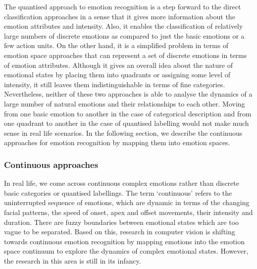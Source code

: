 \documentclass[10pt,journal,cspaper,compsoc]{IEEEtran}
\begin{document}
The quantised approach to emotion recognition is a step forward to the direct classification approaches in a sense that it gives more information about the emotion attributes and intensity. Also, it enables the classification of relatively large numbers of discrete emotions as compared to just the basic emotions or a few action units. On the other hand, it is a simplified problem in terms of emotion space approaches that can represent a set of discrete emotions in terms of emotion attributes. Although it gives an overall idea about the nature of emotional states by placing them into quadrants or assigning some level of intensity, it still leaves them indistinguishable in terms of fine categories. Nevertheless, neither of these two approaches is able to analyse the dynamics of a large number of natural emotions and their relationships to each other. Moving from one basic emotion to another in the case of categorical description and from one quadrant to another in the case of quantised labelling would not make much sense in real life scenarios. In the following section, we describe the continuous approaches for emotion recognition by mapping them into emotion spaces.

\subsubsection{Continuous approaches}

In real life, we come across continuous complex emotions rather than discrete basic categories or quantised labellings. The term `continuous' refers to the uninterrupted sequence of emotions, which are dynamic in terms of the changing facial patterns, the speed of onset, apex and offset movements, their intensity and duration. There are fuzzy boundaries between emotional states which are too vague to be separated. Based on this, research in computer vision is shifting towards continuous emotion recognition by mapping emotions into the emotion space continuum to explore the dynamics of complex emotional states. However, the research in this area is still in its infancy.
\end{document}
